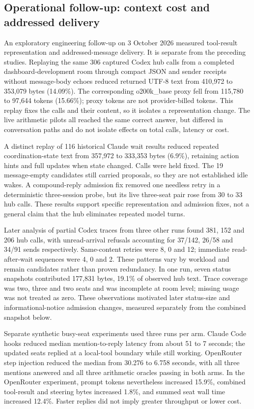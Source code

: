 \subsection{Operational follow-up: context cost and addressed delivery}
\label{sec:results-operational}

An exploratory engineering follow-up on 3 October 2026 measured tool-result representation and addressed-message delivery. It is separate from the preceding studies. Replaying the same 306 captured Codex hub calls from a completed dashboard-development room through compact JSON and sender receipts without message-body echoes reduced returned UTF-8 text from 410,972 to 353,079 bytes (14.09\%). The corresponding o200k\_base proxy fell from 115,780 to 97,644 tokens (15.66\%); proxy tokens are not provider-billed tokens. This replay fixes the calls and their content, so it isolates a representation change. The live arithmetic pilots all reached the same correct answer, but differed in conversation paths and do not isolate effects on total calls, latency or cost.

A distinct replay of 116 historical Claude wait results reduced repeated coordination-state text from 357,972 to 333,353 bytes (6.9\%), retaining action hints and full updates when state changed. Calls were held fixed. The 19 message-empty candidates still carried proposals, so they are not established idle wakes. A compound-reply admission fix removed one needless retry in a deterministic three-session probe, but its live three-seat pair rose from 30 to 33 hub calls. These results support specific representation and admission fixes, not a general claim that the hub eliminates repeated model turns.

Later analysis of partial Codex traces from three other runs found 381, 152 and 206 hub calls, with unread-arrival refusals accounting for 37/142, 26/58 and 34/91 sends respectively. Same-content retries were 8, 0 and 12; immediate read-after-wait sequences were 4, 0 and 2. These patterns vary by workload and remain candidates rather than proven redundancy. In one run, seven status snapshots contributed 177,831 bytes, 19.1\% of observed hub text. Trace coverage was two, three and two seats and was incomplete at room level; missing usage was not treated as zero. These observations motivated later status-size and informational-notice admission changes, measured separately from the combined snapshot below.

Separate synthetic busy-seat experiments used three runs per arm. Claude Code hooks reduced median mention-to-reply latency from about 51 to 7 seconds; the updated seats replied at a local-tool boundary while still working. OpenRouter step injection reduced the median from 30.276 to 6.758 seconds, with all three mentions answered and all three arithmetic oracles passing in both arms. In the OpenRouter experiment, prompt tokens nevertheless increased 15.9\%, combined tool-result and steering bytes increased 1.8\%, and summed seat wall time increased 12.4\%. Faster replies did not imply greater throughput or lower cost.


